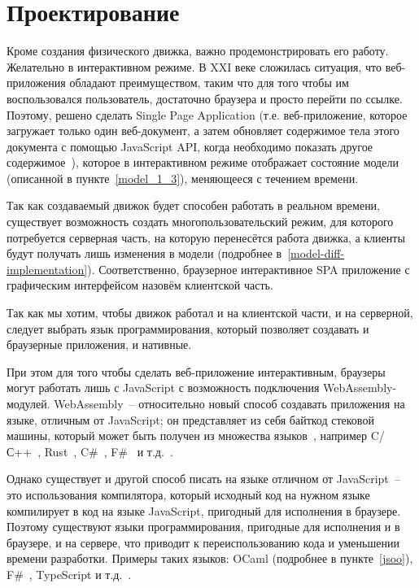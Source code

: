 \chapter{Проектирование}\label{chapter-design}

Кроме создания физического движка, важно продемонстрировать его работу.
Желательно в интерактивном режиме. В XXI веке сложилась ситуация, что веб-приложения
обладают преимуществом, таким что для того чтобы им воспользовался пользователь, достаточно
браузера и просто перейти по ссылке.
Поэтому, решено сделать Single Page Application
(т.е. веб-приложение, которое загружает только один веб-документ,
а затем обновляет содержимое тела этого документа с помощью JavaScript API,
когда необходимо показать другое содержимое~\cite{mdn-spa}),
которое в интерактивном режиме отображает состояние модели (описанной в пункте~\ref{model_1_3}),
меняющееся с течением времени.

Так как создаваемый движок будет способен работать в реальном времени, существует возможность
создать многопользовательский режим, для которого потребуется серверная часть,
на которую перенесётся работа движка, а клиенты будут получать лишь изменения в модели (подробнее в~\ref{model-diff-implementation}).
Соответственно, браузерное интерактивное SPA приложение с графическим интерфейсом назовём клиентской часть.

Так как мы хотим, чтобы движок работал и на клиентской части, и на серверной, следует выбрать язык программирования,
который позволяет создавать и браузерные приложения, и нативные.

При этом для того чтобы сделать веб-приложение интерактивным, браузеры могут работать лишь с JavaScript
с возможность подключения WebAssembly-модулей. WebAssembly~-- относительно новый способ создавать
приложения на языке, отличным от JavaScript; он представляет из себя байткод стековой машины,
который может быть получен из множества языков~\cite{wasm}, например
C/С++~\cite{emscripten-about}, Rust~\cite{rust-wasm}, C\#~\cite{blazor-ru}, F\#~\cite{fsbolero} и т.д.~\cite{wasm-iwantto}.

Однако существует и другой способ
писать на языке отличном от JavaScript~-- это использования компилятора, который исходный код на нужном языке
компилирует в код на языке JavaScript, пригодный для исполнения в браузере. Поэтому существуют языки программирования,
пригодные для исполнения и в браузере, и на сервере, что приводит к переиспользованию кода и уменьшении времени разработки.
Примеры таких языков: OCaml (подробнее в пункте~\ref{jsoo}), F\#~\cite[с.~48]{dsyme-hopl}, TypeScript и т.д.~\cite{typescript-mayorov}.

